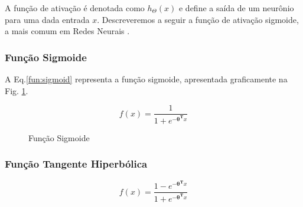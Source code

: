 \cite{activationfun}



A função de ativação é denotada como $h_\Theta (x)$ e define a saída de um neurônio para uma dada entrada $x$. Descreveremos a seguir a função de ativação sigmoide, a mais comum em Redes Neurais \cite{haykin2004comprehensive, haykin2009neural, lecun2015deep}.

\subsubsection{Função Sigmoide}
\label{subsec:sigmoid}

A Eq.\eqref{fun:sigmoid} representa a função sigmoide, apresentada graficamente na Fig. \ref{fg:funcao_sigmoide}. 


\begin{equation}
  f(x) =  \frac{\mathrm{1} }{\mathrm{1} + e^{- \mathbf{\theta^T}x}}
  \label{fun:sigmoid}
\end{equation}

\begin{center}
    \begin{figure}
        \centering
    \caption{Função Sigmoide}\label{fg:funcao_sigmoide}
	\end{figure}
\end{center}

\subsubsection{Função Tangente Hiperbólica}
\label{subsec:htan}

\begin{equation}
  f(x) =  \frac{\mathrm{1} - e^{- \mathbf{\theta^T}x}}{\mathrm{1} + e^{- \mathbf{\theta^T}x}}
  \label{fun:sigmoid}
\end{equation}

